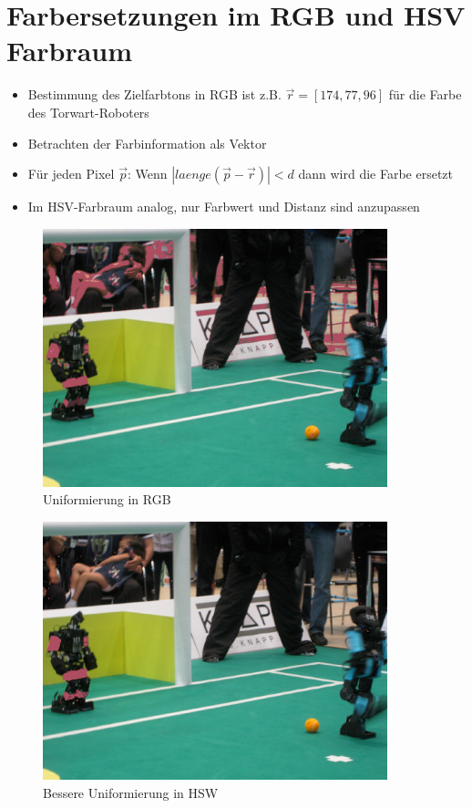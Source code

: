 \section*{Farbersetzungen im RGB und HSV Farbraum}
\begin{itemize}
\item Bestimmung des Zielfarbtons in RGB ist z.B. $\vec{r} = [174,77,96]$ f\"ur 
      die Farbe des Torwart-Roboters
\item Betrachten der Farbinformation als Vektor
\item F\"ur jeden Pixel $\vec{p}$: Wenn $|laenge(\vec{p}-\vec{r})|< d$ dann
      wird die Farbe ersetzt
\item Im HSV-Farbraum analog, nur Farbwert und Distanz sind anzupassen
\end{itemize}

\begin{figure}[H]
\begin{center}
\includegraphics[width=100mm]{u08/dist_rgb.eps}
\end{center}
\caption{Uniformierung in RGB}
\end{figure}

\begin{figure}[H]
\begin{center}
\includegraphics[width=100mm]{u08/dist_hsv.eps}
\end{center}
\caption{Bessere Uniformierung in HSW}
\end{figure}

